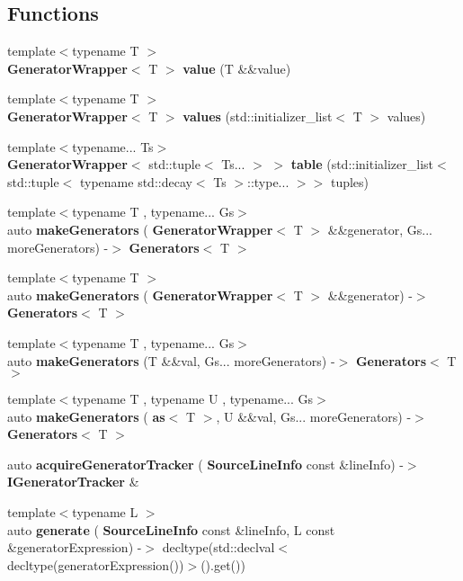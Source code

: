\subsection*{Functions}
\begin{DoxyCompactItemize}
\item 
{\footnotesize template$<$typename T $>$ }\\\textbf{ Generator\+Wrapper}$<$ T $>$ \textbf{ value} (T \&\&value)
\item 
{\footnotesize template$<$typename T $>$ }\\\textbf{ Generator\+Wrapper}$<$ T $>$ \textbf{ values} (std\+::initializer\+\_\+list$<$ T $>$ values)
\item 
{\footnotesize template$<$typename... Ts$>$ }\\\textbf{ Generator\+Wrapper}$<$ std\+::tuple$<$ Ts... $>$ $>$ \textbf{ table} (std\+::initializer\+\_\+list$<$ std\+::tuple$<$ typename std\+::decay$<$ Ts $>$\+::type... $>$$>$ tuples)
\item 
{\footnotesize template$<$typename T , typename... Gs$>$ }\\auto \textbf{ make\+Generators} (\textbf{ Generator\+Wrapper}$<$ T $>$ \&\&generator, Gs... more\+Generators) -\/$>$ \textbf{ Generators}$<$ T $>$
\item 
{\footnotesize template$<$typename T $>$ }\\auto \textbf{ make\+Generators} (\textbf{ Generator\+Wrapper}$<$ T $>$ \&\&generator) -\/$>$ \textbf{ Generators}$<$ T $>$
\item 
{\footnotesize template$<$typename T , typename... Gs$>$ }\\auto \textbf{ make\+Generators} (T \&\&val, Gs... more\+Generators) -\/$>$ \textbf{ Generators}$<$ T $>$
\item 
{\footnotesize template$<$typename T , typename U , typename... Gs$>$ }\\auto \textbf{ make\+Generators} (\textbf{ as}$<$ T $>$, U \&\&val, Gs... more\+Generators) -\/$>$ \textbf{ Generators}$<$ T $>$
\item 
auto \textbf{ acquire\+Generator\+Tracker} (\textbf{ Source\+Line\+Info} const \&line\+Info) -\/$>$ \textbf{ I\+Generator\+Tracker} \&
\item 
{\footnotesize template$<$typename L $>$ }\\auto \textbf{ generate} (\textbf{ Source\+Line\+Info} const \&line\+Info, L const \&generator\+Expression) -\/$>$ decltype(std\+::declval$<$ decltype(generator\+Expression())$>$().get())
\item 
$$
\end{DoxyCompactItemize}
